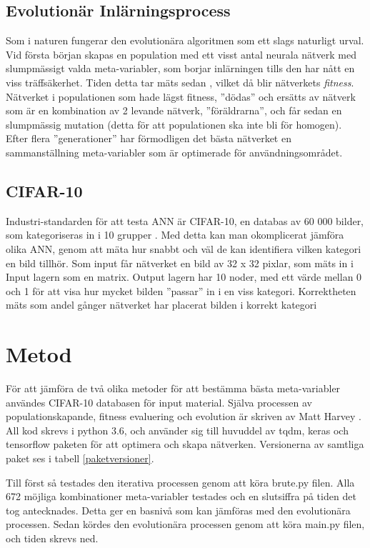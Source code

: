 \documentclass[a4paper, 11pt, twocolumn]{report}
\begin{document}
    \subsection{Evolutionär Inlärningsprocess}
    Som i naturen fungerar den evolutionära algoritmen som ett slags naturligt urval. Vid första början skapas en population med ett visst antal neurala nätverk med slumpmässigt valda meta-variabler, som borjar inlärningen tills den har nått en viss träffsäkerhet. Tiden detta tar mäts sedan , vilket då blir nätverkets \textit{fitness}. Nätverket i populationen som hade lägst fitness, ”dödas” och ersätts av nätverk som är en kombination av 2 levande nätverk, ”föräldrarna”, och får sedan en slumpmässig mutation (detta för att populationen ska inte bli för homogen). Efter flera ”generationer” har förmodligen det bästa nätverket en sammanställning meta-variabler som är optimerade för användningsområdet. \parencite{yao1997new}

    \subsection{CIFAR-10}
    Industri-standarden för att testa ANN är CIFAR-10, en databas av 60 000 bilder, som kategoriseras in i 10 grupper \parencite{krizhevsky2014cifar}. Med detta kan man okomplicerat jämföra olika ANN, genom att mäta hur snabbt och väl de kan identifiera vilken kategori en bild tillhör. Som input får nätverket en bild av 32 x 32 pixlar, som mäts in i Input lagern som en matrix. Output lagern har 10 noder, med ett värde mellan 0 och 1 för att visa hur mycket bilden ”passar” in i en viss kategori. Korrektheten mäts som andel gånger nätverket har placerat bilden i korrekt kategori

  \section{Metod}
  För att jämföra de två olika metoder för att bestämma bästa meta-variabler användes CIFAR-10 databasen för input material. Själva processen av populationskapande, fitness evaluering och evolution är skriven av Matt Harvey \parencite{harvey2017}. All kod skrevs i python 3.6, och använder sig till huvuddel av tqdm, keras och tensorflow paketen för att optimera och skapa nätverken. Versionerna av samtliga paket ses i tabell \ref{paketversioner}.

  Till först så testades den iterativa processen genom att köra brute.py filen. Alla 672 möjliga kombinationer meta-variabler testades och en slutsiffra på tiden det tog antecknades. Detta ger en basnivå som kan jämföras med den evolutionära processen. Sedan kördes den evolutionära processen genom att köra main.py filen, och tiden skrevs ned.
\end{document}
